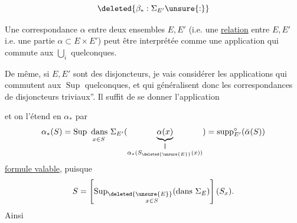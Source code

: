 \[
\deleted{\beta_*:\Sigma_{E'}\unsure{:}}
\]

\uline{} Une correspondance $\alpha$ entre deux ensembles $E,E'$ (i.e. une \uline{relation} entre $E,E'$ i.e. une partie $\alpha\subset E\times E'$) peut être interprétée comme une application
qui commute aux $\bigcup_i$ quelconques.

De même,  si $E,E'$ sont des disjoncteurs, je vais considérer les applications
qui commutent aux $\operatorname{Sup}$ quelconques, et qui généralisent donc les correspondances de disjoncteurs triviaux''. Il suffit de se donner l'application

et on  l'étend en $\alpha_*$ par
\[
\alpha_*(S)=\underset{x\in S}{\operatorname{Sup}\text{ dans }\Sigma_{E'}}
(\underbrace{\alpha(x)}_{\substack{\Vert\\\alpha_*(S_{\deleted{\unsure{E}}}(x))}})
=\operatorname{supp}^{\circ}_{E'}(\bar\alpha(S))
\]
\uline{formule valable}, puisque
\[
S=\left[\underset{x\in S}{\operatorname{Sup}_{\deleted{\unsure{E}}}(\text{dans }\Sigma_E)}\right](S_x).
\]
Ainsi

